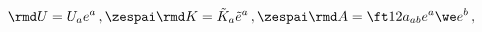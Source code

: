 \begin{equation}
\rmd U = U_a e^a \,, \zespai  \rmd K=\tilde K_a \tilde e^a \,, \zespai
\rmd A=\ft12a_{ab} e^a \we e^b\,,
\end{equation}

